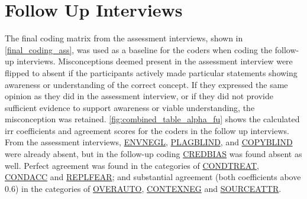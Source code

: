 \section{Follow Up Interviews}
The final coding matrix from the assessment interviews, shown in \autoref{final_coding_ass}, was used as a baseline for the coders when coding the follow-up interviews. Misconceptions deemed present in the assessment interview were flipped to absent if the participants actively made particular statements showing awareness or understanding of the correct concept. If they expressed the same opinion as they did in the assessment interview, or if they did not provide sufficient evidence to support awareness or viable understanding, the misconception was retained. \autoref{fig:combined_table_alpha_fu} shows the calculated \gls{irr} coefficients and agreement scores for the coders in the follow up interviews. From the assessment interviews, \hyperref[envnegl]{ENVNEGL}, \hyperref[plagblind]{PLAGBLIND}, and \hyperref[copyblind]{COPYBLIND} were already absent, but in the follow-up coding \hyperref[credbias]{CREDBIAS} was found absent as well. Perfect agreement was found in the categories of \hyperref[condtreat]{CONDTREAT}, \hyperref[condacc]{CONDACC} and \hyperref[replfear]{REPLFEAR};
and substantial agreement (both coefficients above 0.6) in the categories of \hyperref[overauto]{OVERAUTO}, \hyperref[contexneg]{CONTEXNEG} and \hyperref[sourceattr]{SOURCEATTR}.

